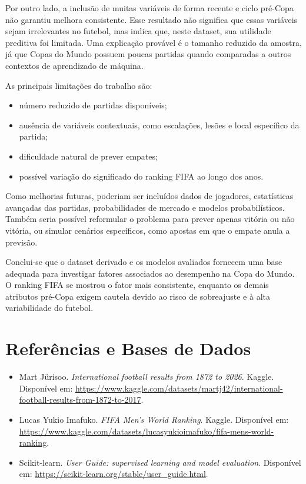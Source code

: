 \documentclass[12pt,a4paper]{article}
\begin{document}
Por outro lado, a inclusão de muitas variáveis de forma recente e ciclo pré-Copa
não garantiu melhora consistente. Esse resultado não significa que essas
variáveis sejam irrelevantes no futebol, mas indica que, neste dataset, sua
utilidade preditiva foi limitada. Uma explicação provável é o tamanho reduzido da
amostra, já que Copas do Mundo possuem poucas partidas quando comparadas a outros
contextos de aprendizado de máquina.

As principais limitações do trabalho são:

\begin{itemize}
    \item número reduzido de partidas disponíveis;
    \item ausência de variáveis contextuais, como escalações, lesões e local
    específico da partida;
    \item dificuldade natural de prever empates;
    \item possível variação do significado do ranking FIFA ao longo dos anos.
\end{itemize}

Como melhorias futuras, poderiam ser incluídos dados de jogadores, estatísticas
avançadas das partidas, probabilidades de mercado e modelos probabilísticos.
Também seria possível reformular o problema para prever apenas vitória ou não
vitória, ou simular cenários específicos, como apostas em que o empate anula a
previsão.

Conclui-se que o dataset derivado e os modelos avaliados fornecem uma base
adequada para investigar fatores associados ao desempenho na Copa do Mundo. O
ranking FIFA se mostrou o fator mais consistente, enquanto os demais atributos
pré-Copa exigem cautela devido ao risco de sobreajuste e à alta variabilidade do
futebol.

\section*{Referências e Bases de Dados}

\begin{itemize}
    \item Mart Jürisoo. \textit{International football results from 1872 to
    2026}. Kaggle. Disponível em:
    \url{https://www.kaggle.com/datasets/martj42/international-football-results-from-1872-to-2017}.
    \item Lucas Yukio Imafuko. \textit{FIFA Men's World Ranking}. Kaggle.
    Disponível em:
    \url{https://www.kaggle.com/datasets/lucasyukioimafuko/fifa-mens-world-ranking}.
    \item Scikit-learn. \textit{User Guide: supervised learning and model
    evaluation}. Disponível em: \url{https://scikit-learn.org/stable/user_guide.html}.
    
\end{itemize}
\end{document}

